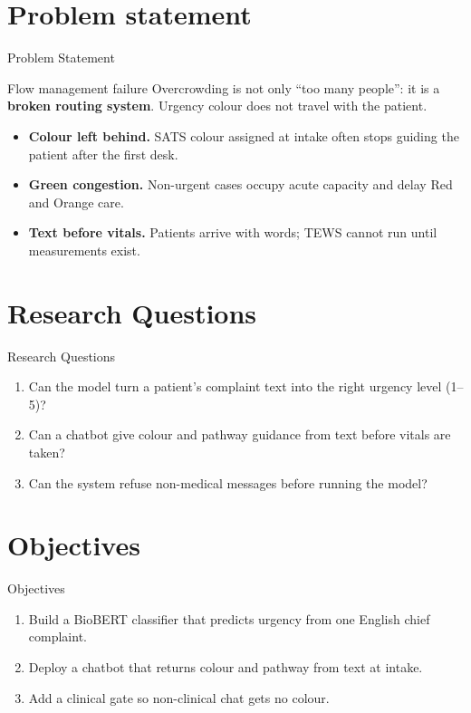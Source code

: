 \section{Problem statement}

\begin{frame}{Problem Statement}
	\begin{alertblock}{Flow management failure}
		Overcrowding is not only ``too many people'': it is a \textbf{broken routing system}.
		Urgency colour does not travel with the patient.
	\end{alertblock}
	\begin{itemize}
		\item \textbf{Colour left behind.} SATS colour assigned at intake often stops guiding the patient after the first desk.
		\item \textbf{Green congestion.} Non-urgent cases occupy acute capacity and delay Red and Orange care.
		\item \textbf{Text before vitals.} Patients arrive with words; TEWS cannot run until measurements exist.
	\end{itemize}
\end{frame}

\section{Research Questions}

\begin{frame}{Research Questions}
	\begin{enumerate}
		\item Can the model turn a patient's complaint text into the right urgency level (1--5)?
		\item Can a chatbot give colour and pathway guidance from text before vitals are taken?
		\item Can the system refuse non-medical messages before running the model?
	\end{enumerate}
\end{frame}

\section{Objectives}

\begin{frame}{Objectives}
	\begin{enumerate}
		\item Build a BioBERT classifier that predicts urgency from one English chief complaint.
		\item Deploy a chatbot that returns colour and pathway from text at intake.
		\item Add a clinical gate so non-clinical chat gets no colour.
	\end{enumerate}
\end{frame}
